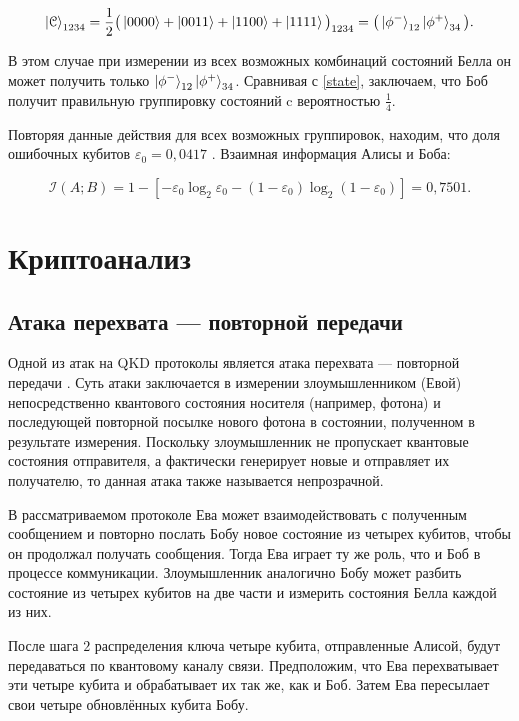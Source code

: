 \documentclass[a4paper,11pt]{article}
\begin{document}
\begin{equation*}
\ket{\mathcal{C}}_{1234} = \dfrac{1}{2} \big(\ket{0000} + \ket{0011}
 + \ket{1100} + \ket{1111} \big)_{1234} = \big(\ket{\phi^-}_{12} \ket{\phi^+}_{34}\big).
\end{equation*}

В этом случае при измерении из всех возможных комбинаций состояний Белла он может получить только $\ket{\phi^-}_{12} \ket{\phi^+}_{34}$. Сравнивая с \eqref{state}, заключаем, что Боб получит правильную группировку состояний c вероятностью $\frac{1}{4}$.

Повторяя данные действия для всех возможных группировок, находим, что доля ошибочных кубитов $\varepsilon_0 = 0,0417$ \cite{base}. Взаимная информация Алисы и Боба:

\begin{equation}\label{mutual_ab}
\mathcal{I}(A; B) = 1 - [- \varepsilon_0 \log_2 \varepsilon_0 -(1-\varepsilon_0)\log_2(1-\varepsilon_0) ] = 0,7501.
\end{equation}

\section{Криптоанализ}\label{analize}

\subsection{Атака перехвата --- повторной передачи}
Одной из атак на QKD протоколы является атака перехвата --- повторной передачи \cite{ira1, ira2, ira3}. Суть атаки заключается в измерении злоумышленником (Евой) непосредственно квантового состояния носителя (например, фотона) и последующей повторной посылке нового фотона в состоянии, полученном в результате измерения. Поскольку злоумышленник не пропускает квантовые состояния отправителя, а фактически генерирует новые и отправляет их получателю, то данная атака также называется непрозрачной. 

В рассматриваемом протоколе Ева может взаимодействовать с полученным сообщением и повторно послать Бобу новое состояние из четырех кубитов, чтобы он продолжал получать сообщения. Тогда Ева играет ту же роль, что и Боб в процессе коммуникации. Злоумышленник аналогично Бобу может разбить состояние из четырех кубитов на две части и измерить состояния Белла каждой из них.

После шага $2$ распределения ключа четыре кубита, отправленные Алисой, будут передаваться по квантовому каналу связи. Предположим, что Ева перехватывает эти четыре кубита и обрабатывает их так же, как и Боб. Затем Ева пересылает свои четыре обновлённых кубита Бобу. 
\end{document}

